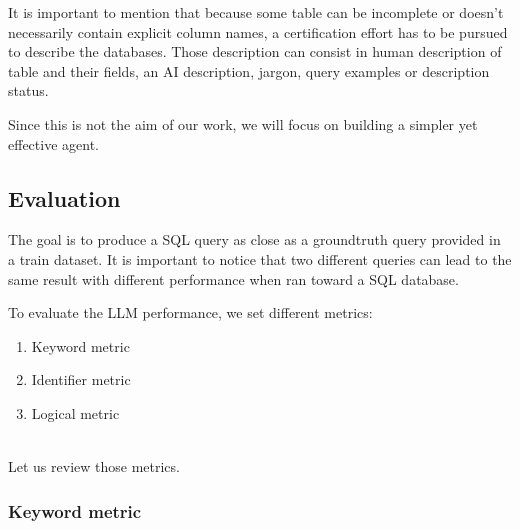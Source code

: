\documentclass[12pt,a4paper]{article}
\begin{document}
It is important to mention that because some table can be incomplete or doesn't necessarily contain explicit column names, a certification effort has to be pursued to describe the databases. Those description can consist in human description of table and their fields, an AI description, jargon, query examples or description status.

Since this is not the aim of our work, we will focus on building a simpler yet effective agent.
\vspace{1cm}


\subsection*{Evaluation}
The goal is to produce a SQL query as close as a groundtruth query provided in a train dataset. It is important to notice that two different queries can lead to the same result with different performance when ran toward a SQL database.

To evaluate the LLM performance, we set different metrics:
\begin{enumerate}
    \item Keyword metric
    \item Identifier metric
    \item Logical metric
\end{enumerate}

\\
Let us review those metrics.

\subsubsection*{Keyword metric}
\end{document}
